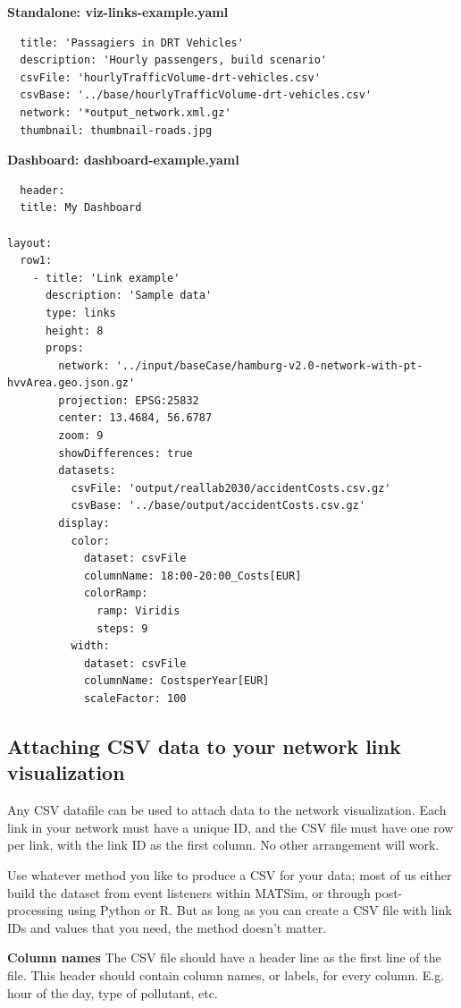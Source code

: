 \textbf{Standalone: viz-links-example.yaml}

\begin{lstlisting}
  title: 'Passagiers in DRT Vehicles'
  description: 'Hourly passengers, build scenario'
  csvFile: 'hourlyTrafficVolume-drt-vehicles.csv'
  csvBase: '../base/hourlyTrafficVolume-drt-vehicles.csv'
  network: '*output_network.xml.gz'
  thumbnail: thumbnail-roads.jpg
\end{lstlisting}

\textbf{Dashboard: dashboard-example.yaml}
\begin{lstlisting}
  header:
  title: My Dashboard

layout:
  row1:
    - title: 'Link example'
      description: 'Sample data'
      type: links
      height: 8
      props:
        network: '../input/baseCase/hamburg-v2.0-network-with-pt-hvvArea.geo.json.gz'
        projection: EPSG:25832
        center: 13.4684, 56.6787
        zoom: 9
        showDifferences: true
        datasets:
          csvFile: 'output/reallab2030/accidentCosts.csv.gz'
          csvBase: '../base/output/accidentCosts.csv.gz'
        display:
          color:
            dataset: csvFile
            columnName: 18:00-20:00_Costs[EUR]
            colorRamp:
              ramp: Viridis
              steps: 9
          width:
            dataset: csvFile
            columnName: CostsperYear[EUR]
            scaleFactor: 100
\end{lstlisting}


\hypertarget{attaching-csv-data-to-your-network-link-visualization}{%
\subsection{Attaching CSV data to your network link
visualization}\label{attaching-csv-data-to-your-network-link-visualization}}

Any CSV datafile can be used to attach data to the network
visualization. Each link in your network must have a unique ID, and the
CSV file must have one row per link, with the link ID as the first
column. No other arrangement will work.

Use whatever method you like to produce a CSV for your data; most of us
either build the dataset from event listeners within MATSim, or through
post-processing using Python or R. But as long as you can create a CSV
file with link IDs and values that you need, the method doesn't matter.

\textbf{Column names} The CSV file should have a header line as the
first line of the file. This header should contain column names, or
labels, for every column. E.g. hour of the day, type of pollutant, etc.

